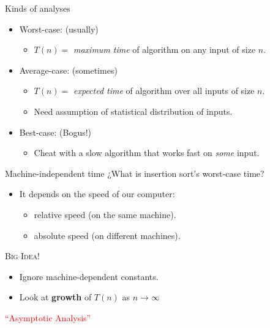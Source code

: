 \documentclass{beamer}
\begin{document}
\begin{frame}{Kinds of analyses}
    \begin{itemize}
        \item Worst-case: (usually)
        \begin{itemize}
            \item $T(n)=$ \textit{maximum time} of algorithm on any input of size $n$.
        \end{itemize}
        \item Average-case: (sometimes)
        \begin{itemize}
            \item $T(n)=$ \textit{expected time} of algorithm over all inputs of size $n$.
            \item Need assumption of statistical distribution of inputs.
        \end{itemize}
        \item Best-case: (Bogus!)
        \begin{itemize}
            \item Cheat with a slow algorithm that works fast on \textit{some} input.
        \end{itemize}
    \end{itemize}
\end{frame}

\begin{frame}{Machine-independent time}
    ¿What is insertion sort's worst-case time?
    \begin{itemize}
        \item It depends on the speed of our computer:
        \begin{itemize}
            \item relative speed (on the same machine).
            \item absolute speed (on different machines).
        \end{itemize}
    \end{itemize}
    \textsc{Big Idea!}
    \begin{itemize}
     \item Ignore machine-dependent constants.
     \item Look at \textbf{growth} of $T(n)$ as $n \rightarrow \infty$
    \end{itemize}
    
    \centering
    \Large \textcolor{red}{``Asymptotic Analysis''}    
\end{frame}
\end{document}
